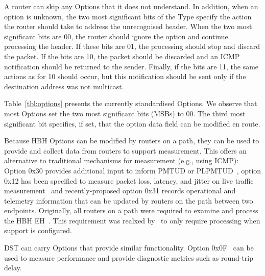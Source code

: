 \documentclass[conference]{IEEEtran}
\begin{document}
A router can skip any Options that it does not understand. In addition, when an option is unknown, the two most significant bits of the Type
specify the action the router should take to address the unrecognised header. When the two most significant bits are 00, the router should
ignore the option and continue processing the header. If these bits are 01, the
processing should stop and discard the packet. If the bits are 10,
the packet should be discarded and an ICMP notification should be returned to
the sender. Finally, if the bits are 11, the same actions as for 10 should occur,
but this notification should be sent only if the destination address was not multicast. 

Table~\ref{tbl:options} presents the currently standardised 
Options.  We observe that most Options set the two most significant bits
(MSBs) to 00.  The third most significant bit specifies, if set, that the option data field can be modified en route.

Because HBH Options can be modified by routers on a path, they can be used to provide and collect data from routers to support measurement. This offers an alternative to traditional mechanisms for measurement (e.g., using ICMP):
Option 0x30 provides additional input to inform  PMTUD or PLPMTUD~\cite{rfc9268}, option
0x12 has been specified to measure packet loss, latency, and jitter on live
traffic measurement~\cite{rfc9343} and recently-proposed option 0x31 records
operational and telemetry information that can be updated by routers on the
path between two endpoints. 
Originally, all routers on a path were required to examine and process the HBH EH~\cite{rfc2460}. This requirement was realxed by~\cite{RFC8200} to
only require processing when support is  configured.


DST can carry Options that provide similar functionality. Option 0x0F~\cite{rfc8250} can be used to measure performance and provide diagnostic metrics such as round-trip delay. 


\end{document}

